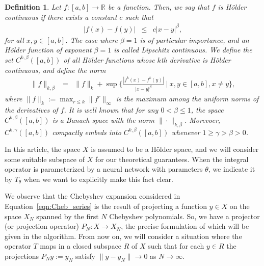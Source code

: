 \documentclass[11pt,fleqn]{amsart} %
\newtheorem{definition}[theorem]{Definition}
\begin{document}
		\begin{definition}
				{\rm 
						Let $f: [a,b] \longrightarrow \mathbb R$ be a function. Then, we say that $f$ is {\it H\"older continuous} if there exists a constant $c$ such that 
						\begin{eqnarray*}
								|f(x) - f(y)| &\leq& c|x-y|^\beta ,
						\end{eqnarray*}
						for all $x,y\in [a,b]$. The case where $\beta=1$ is of particular importance, and an H\"older function of exponent $\beta = 1$ is called {\it Lipschitz continuous}. We define the set $C^{k,\beta}([a,b])$ of all H\"older functions whose $k$th derivative is H\"older continuous, and define the norm 
						\begin{eqnarray*}
								\|f\|_{k,\beta} &=& \|f\|_k + \sup\{\frac{|f^k(x) - f^k(y)|}{|x-y|^\beta} \ |\ x,y\in [a,b], x\neq y \},  
						\end{eqnarray*}
						where $\|f\|_k := \max_{r\leq k} \|f^r\|_\infty$ is the maximum among the uniform norms of the derivatives of $f$. It is well known that for any $0<\beta \leq 1$, the space $C^{k,\beta}([a,b])$ is a Banach space with the norm $\|\cdot \|_{k,\beta}$. Morevoer, $C^{k,\gamma}([a,b])$ compactly embeds into $C^{k,\beta}([a,b])$ whenever $1 \geq \gamma > \beta >0$.  
				}
		\end{definition}
	
	In this article, the space $X$ is assumed to be a H\"older space, and we will consider some suitable subspace of $X$ for our theoretical guarantees. 
	When the integral operator is parameterized by a neural network with parameters $\theta$, we indicate it by $T_\theta$ when we want to explicitly make this fact clear. 
	
	We observe that the Chebyshev expansion considered in Equation~\eqref{eqn:Cheb_series} is the result of projecting a function $y\in X$ on the space $X_N$ spanned by the first $N$ Chebyshev polynomials. So, we have a projector (or projection operator) $P_N : X \longrightarrow X_N$, the precise formulation of which will be given in the algorithm. From now on, we will consider a situation where the operator $T$ maps in a closed subspace $R$ of $X$ such that for each $y\in R$ the projections $P_Ny := y_N$ satisfy $\|y - y_N\| \longrightarrow 0$ as $N \longrightarrow \infty$. 
	
\end{document}
